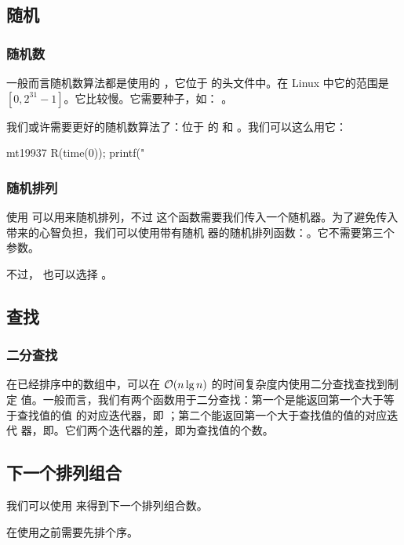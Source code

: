 \subsection{随机}
\subsubsection{随机数}
一般而言随机数算法都是使用的 ，它位于  的头文件中。在
Linux 中它的范围是 $[0, 2^{31} - 1]$。它比较慢。它需要种子，如：
。

我们或许需要更好的随机数算法了：位于  的  和
。我们可以这么用它：
\begin{Cpp}
mt19937 R(time(0));
printf("%
\end{Cpp}

\subsubsection{随机排列}
使用  可以用来随机排列，不过
这个函数需要我们传入一个随机器。为了避免传入带来的心智负担，我们可以使用带有随机
器的随机排列函数：。它不需要第三个参数。

不过， 也可以选择 。



\subsection{查找}
\label{subsec:查找}

\subsubsection{二分查找}
在已经排序中的数组中，可以在 $\mathcal{O}(n\lg n)$ 的时间复杂度内使用二分查找查找到制定
值。一般而言，我们有两个函数用于二分查找：第一个是能返回第一个大于等于查找值的值
的对应迭代器，即 ；第二个能返回第一个大于查找值的值的对应迭代
器，即。它们两个迭代器的差，即为查找值的个数。



\subsection{下一个排列组合}
我们可以使用  来得到下一个排列组合数。

在使用之前需要先排个序。



